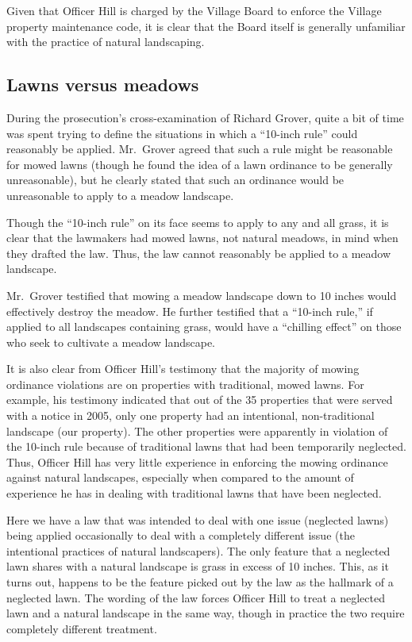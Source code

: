 \documentclass[12pt]{article}
\begin{document}
Given that Officer Hill is charged by the Village Board to enforce the Village property maintenance code, it is clear that the Board itself is generally unfamiliar with the practice of natural landscaping.

\subsection{Lawns versus meadows}
\label{lawns_vs_meadows}

During the prosecution's cross-examination of Richard Grover, quite a bit of time was spent trying to define the situations in which a ``10-inch rule'' could reasonably be applied.
Mr.\ Grover agreed that such a rule might be reasonable for mowed lawns (though he found the idea of a lawn ordinance to be generally unreasonable), but he clearly stated that such an ordinance would be unreasonable to apply to a meadow landscape.

Though the ``10-inch rule'' on its face seems to apply to any and all grass, it is clear that the lawmakers had mowed lawns, not natural meadows, in mind when they drafted the law.
Thus, the law cannot reasonably be applied to a meadow landscape.

Mr.\ Grover testified that mowing a meadow landscape down to 10 inches would effectively destroy the meadow.
He further testified that a ``10-inch rule,'' if applied to all landscapes containing grass, would have a ``chilling effect'' on those who seek to cultivate a meadow landscape.

It is also clear from Officer Hill's testimony that the majority of mowing ordinance violations are on properties with traditional, mowed lawns.
For example, his testimony indicated that out of the 35 properties that were served with a notice in 2005, only one property had an intentional, non-traditional landscape (our property).
The other properties were apparently in violation of the 10-inch rule because of traditional lawns that had been temporarily neglected.
Thus, Officer Hill has very little experience in enforcing the mowing ordinance against natural landscapes, especially when compared to the amount of experience he has in dealing with traditional lawns that have been neglected.

Here we have a law that was intended to deal with one issue (neglected lawns) being applied occasionally to deal with a completely different issue (the intentional practices of natural landscapers).
The only feature that a neglected lawn shares with a natural landscape is grass in excess of 10 inches.
This, as it turns out, happens to be the feature picked out by the law as the hallmark of a neglected lawn.
The wording of the law forces Officer Hill to treat a neglected lawn and a natural landscape in the same way, though in practice the two require completely different treatment.
\end{document}
